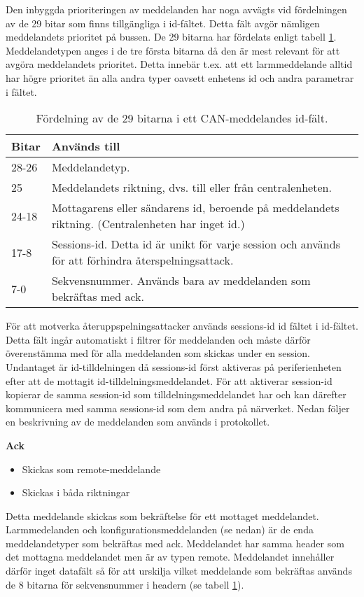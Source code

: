 Den inbyggda prioriteringen av meddelanden har noga avvägts vid fördelningen av de 29 bitar som finns tillgängliga i id-fältet.
Detta fält avgör nämligen meddelandets prioritet på bussen.
De 29 bitarna har fördelats enligt tabell \ref{tab:idbitar}. Meddelandetypen anges i de tre första bitarna då den är mest relevant för att avgöra meddelandets prioritet. Detta innebär t.ex. att ett larmmeddelande alltid har högre prioritet än alla andra typer oavsett enhetens id och andra parametrar i fältet.

\begin{table}[H]
	\centering
	\begin{tabular}{|l|p{}|}
		\hline
		Bitar 	& Används till \\ \hline \hline
		28-26	& Meddelandetyp. \\ \hline
		25		& Meddelandets riktning, dvs. till eller från centralenheten. \\ \hline
		24-18	& Mottagarens eller sändarens id, beroende på meddelandets riktning. (Centralenheten har inget id.) \\ \hline
		17-8 & Sessions-id. Detta id är unikt för varje session och används för att förhindra återspelningsattack. \\ \hline
		7-0 & Sekvensnummer. Används bara av meddelanden som bekräftas med ack. \\ \hline

	\end{tabular}
	\caption{Fördelning av de 29 bitarna i ett CAN-meddelandes id-fält.}
	\label{tab:idbitar}
\end{table}


För att motverka återuppspelningsattacker används sessions-id id fältet i id-fältet. Detta fält ingår automatiskt i filtrer för meddelanden och måste därför överenstämma med för alla meddelanden som skickas under en session. Undantaget är id-tilldelningen då sessions-id först aktiveras på periferienheten efter att de mottagit id-tilldelningsmeddelandet. För att aktiverar session-id kopierar de samma session-id som tilldelningsmeddelandet har och kan därefter kommunicera med samma sessions-id som dem andra på närverket. Nedan följer en beskrivning av de meddelanden som används i protokollet.


\textbf{Ack}
\begin{itemize}
	\item Skickas som remote-meddelande
    \item Skickas i båda riktningar
\end{itemize}
Detta meddelande skickas som bekräftelse för ett mottaget meddelandet. Larmmedelanden och konfigurationsmeddelanden (se nedan) är de enda meddelandetyper som bekräftas med ack. Meddelandet har samma header som det mottagna meddelandet men är av typen remote. Meddelandet innehåller därför inget datafält så för att urskilja vilket meddelande som bekräftas används de 8 bitarna för sekvensnummer i headern (se tabell \ref{tab:idbitar}). \\

